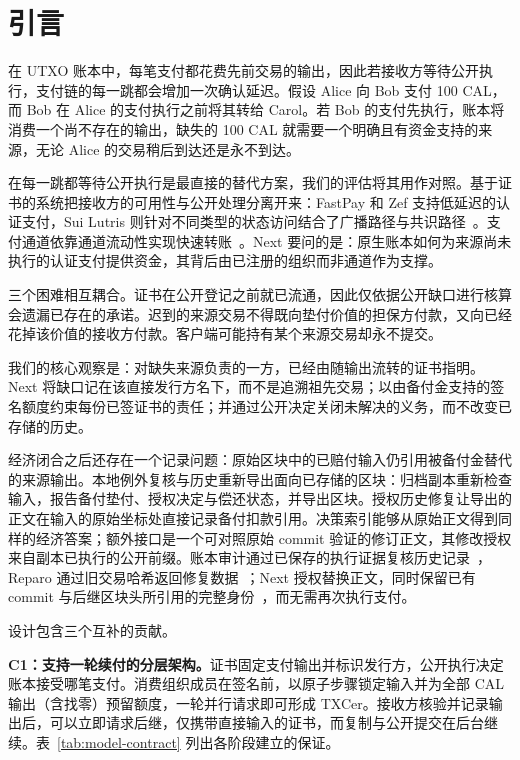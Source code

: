 \section{引言}
\label{sec:introduction}

在 UTXO 账本中，每笔支付都花费先前交易的输出，因此若接收方等待公开执行，支付链的每一跳都会增加一次确认延迟。假设 Alice 向 Bob 支付 100 CAL，而 Bob 在 Alice 的支付执行之前将其转给 Carol。若 Bob 的支付先执行，账本将消费一个尚不存在的输出，缺失的 100 CAL 就需要一个明确且有资金支持的来源，无论 Alice 的交易稍后到达还是永不到达。

在每一跳都等待公开执行是最直接的替代方案，我们的评估将其用作对照。基于证书的系统把接收方的可用性与公开处理分离开来：FastPay 和 Zef 支持低延迟的认证支付，Sui Lutris 则针对不同类型的状态访问结合了广播路径与共识路径~\cite{fastpay,zef,lutris}。支付通道依靠通道流动性实现快速转账~\cite{blitz,donner}。Next 要问的是：原生账本如何为来源尚未执行的认证支付提供资金，其背后由已注册的组织而非通道作为支撑。

三个困难相互耦合。证书在公开登记之前就已流通，因此仅依据公开缺口进行核算会遗漏已存在的承诺。迟到的来源交易不得既向垫付价值的担保方付款，又向已经花掉该价值的接收方付款。客户端可能持有某个来源交易却永不提交。

我们的核心观察是：对缺失来源负责的一方，已经由随输出流转的证书指明。Next 将缺口记在该直接发行方名下，而不是追溯祖先交易；以由备付金支持的签名额度约束每份已签证书的责任；并通过公开决定关闭未解决的义务，而不改变已存储的历史。

经济闭合之后还存在一个记录问题：原始区块中的已赔付输入仍引用被备付金替代的来源输出。本地例外复核与历史重新导出面向已存储的区块：归档副本重新检查输入，报告备付垫付、授权决定与偿还状态，并导出区块。授权历史修复让导出的正文在输入的原始坐标处直接记录备付扣款引用。决策索引能够从原始正文得到同样的经济答案；额外接口是一个可对照原始 commit 验证的修订正文，其修改授权来自副本已执行的公开前缀。账本审计通过已保存的执行证据复核历史记录~\cite{ia-ccf}，Reparo 通过旧交易哈希返回修复数据~\cite{reparo}；Next 授权替换正文，同时保留已有 commit 与后继区块头所引用的完整身份~\cite{comet-blockid}，而无需再次执行支付。

设计包含三个互补的贡献。

\noindent\textbf{C1：支持一轮续付的分层架构。}证书固定支付输出并标识发行方，公开执行决定账本接受哪笔支付。消费组织成员在签名前，以原子步骤锁定输入并为全部 CAL 输出（含找零）预留额度，一轮并行请求即可形成 TXCer。接收方核验并记录输出后，可以立即请求后继，仅携带直接输入的证书，而复制与公开提交在后台继续。表~\ref{tab:model-contract} 列出各阶段建立的保证。

